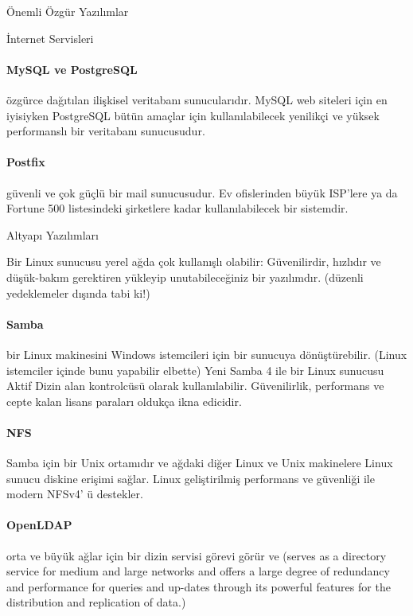 \documentclass[10pt,a5paper]{book}
\begin{document}
\begin{section}{Önemli Özgür Yazılımlar}
\begin{subsection}{İnternet Servisleri}
\paragraph{MySQL ve PostgreSQL}{özgürce dağıtılan ilişkisel veritabanı sunucularıdır. MySQL web siteleri için en iyisiyken PostgreSQL bütün amaçlar için kullanılabilecek yenilikçi ve yüksek performanslı bir veritabanı sunucusudur.}
\paragraph{Postfix}{güvenli ve çok güçlü bir mail sunucusudur. Ev ofislerinden büyük ISP'lere ya da Fortune 500 listesindeki şirketlere kadar kullanılabilecek bir sistemdir.}
\end{subsection}
\begin{subsection}{Altyapı Yazılımları}

Bir Linux sunucusu yerel ağda çok kullanışlı olabilir: Güvenilirdir, hızlıdır ve düşük-bakım gerektiren yükleyip unutabileceğiniz bir yazılımdır. (düzenli yedeklemeler dışında tabi ki!)
\paragraph{Samba}{bir Linux makinesini Windows istemcileri için bir sunucuya dönüştürebilir. (Linux istemciler içinde bunu yapabilir elbette) Yeni Samba 4 ile bir Linux sunucusu Aktif Dizin alan kontrolcüsü olarak kullanılabilir. Güvenilirlik, performans ve cepte kalan lisans paraları oldukça ikna edicidir.}
\paragraph{NFS}{Samba için bir Unix ortamıdır ve ağdaki diğer Linux ve Unix makinelere Linux sunucu diskine erişimi sağlar. Linux geliştirilmiş performans ve güvenliği ile modern NFSv4' ü destekler.}
\paragraph{OpenLDAP}{orta ve büyük ağlar için bir dizin servisi görevi görür ve (serves as a directory service for medium and large networks and offers a large degree of redundancy and performance for queries and up-dates through its powerful features for the distribution and replication of data.)}

\end{subsection}
\end{section}
\end{document}
